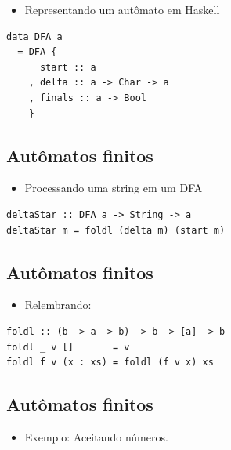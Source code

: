 \documentclass[11pt]{article}
\begin{document}
\begin{itemize}
\item Representando um autômato em Haskell
\end{itemize}

\begin{verbatim}
data DFA a
  = DFA {
      start :: a
    , delta :: a -> Char -> a
    , finals :: a -> Bool
    } 
\end{verbatim}
\subsection*{Autômatos finitos}
\label{sec:org70a16ee}

\begin{itemize}
\item Processando uma string em um DFA
\end{itemize}

\begin{verbatim}
deltaStar :: DFA a -> String -> a
deltaStar m = foldl (delta m) (start m)
\end{verbatim}
\subsection*{Autômatos finitos}
\label{sec:org4e2b316}

\begin{itemize}
\item Relembrando:
\end{itemize}

\begin{verbatim}
foldl :: (b -> a -> b) -> b -> [a] -> b
foldl _ v []       = v
foldl f v (x : xs) = foldl (f v x) xs
\end{verbatim}
\subsection*{Autômatos finitos}
\label{sec:org422fa95}

\begin{itemize}
\item Exemplo: Aceitando números.
\end{itemize}
\end{document}
